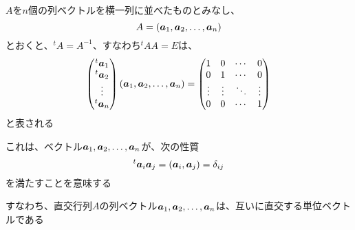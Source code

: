 \documentclass[../../../topic_linear-algebra]{subfiles}
\begin{document}
$A$を$n$個の列ベクトルを横一列に並べたものとみなし、
\begin{equation*}
  A = (\vb*{a}_1, \vb*{a}_2, \ldots, \vb*{a}_n)
\end{equation*}
とおくと、${}^t A = A^{-1}$、すなわち${}^tAA = E$は、
\begin{equation*}
  \begin{pmatrix}
    {}^t \vb*{a}_1 \\
    {}^t \vb*{a}_2 \\
    \vdots         \\
    {}^t \vb*{a}_n
  \end{pmatrix} \left(
  \vb*{a}_1, \vb*{a}_2, \ldots, \vb*{a}_n
  \right) = \begin{pmatrix}
    1      & 0      & \cdots & 0      \\
    0      & 1      & \cdots & 0      \\
    \vdots & \vdots & \ddots & \vdots \\
    0      & 0      & \cdots & 1
  \end{pmatrix}
\end{equation*}
と表される

\br

これは、ベクトル$\vb*{a}_1, \vb*{a}_2, \ldots, \vb*{a}_n$が、次の性質
\begin{equation*}
  {}^t \vb*{a}_i \vb*{a}_j =(\vb*{a}_i, \vb*{a}_j) = \delta_{ij}
\end{equation*}
を満たすことを意味する

\br

すなわち、直交行列$A$の列ベクトル$\vb*{a}_1, \vb*{a}_2, \ldots, \vb*{a}_n$は、互いに直交する単位ベクトルである
\end{document}
